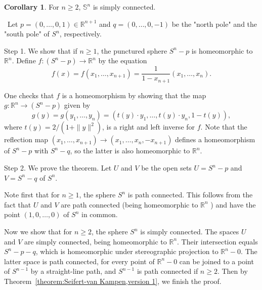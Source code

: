 \documentclass[12pt,a4paper]{book}
\newenvironment{prooff}{{\noindent\it\textcolor{cyan!40!black}{Proof}:}\,}{\par}
\newcommand{\bb}[1]{\mathbb{#1}}
\theoremstyle{definition}
\newtheorem{coro}[defn]{Corollary}
\begin{document}
\begin{coro}
    For $n\ge 2$, $\bb{S}^n$ is simply connected.
    \label{corollary:Sn is simply connect}
\end{coro}
\begin{prooff}
    Let $p=(0, \ldots, 0,1) \in \mathbb{R}^{n+1}$ and $q=(0, \ldots, 0,-1)$ be the "north pole" and the "south pole" of $S^n$, respectively.

    Step 1. We show that if $n \geq 1$, the punctured sphere $S^n-p$ is homeomorphic to $\mathbb{R}^n$.
    Define $f:\left(S^n-p\right) \rightarrow \mathbb{R}^n$ by the equation
    $$
        f(x)=f\left(x_1, \ldots, x_{n+1}\right)=\frac{1}{1-x_{n+1}}\left(x_1, \ldots, x_n\right) .
    $$

    One checks that $f$ is a homeomorphism by showing that the map $g: \mathbb{R}^n \rightarrow\left(S^n-p\right)$ given by
    $$
        g(y)=g\left(y_1, \ldots, y_n\right)=\left(t(y) \cdot y_1, \ldots, t(y) \cdot y_n, 1-t(y)\right),
    $$
    where $t(y)=2 /\left(1+\|y\|^2\right)$, is a right and left inverse for $f$.
    Note that the reflection map $\left(x_1, \ldots, x_{n+1}\right) \rightarrow\left(x_1, \ldots, x_n,-x_{n+1}\right)$ defines a homeomorphism of $S^n-p$ with $S^n-q$, so the latter is also homeomorphic to $\mathbb{R}^n$.

    Step 2. We prove the theorem. Let $U$ and $V$ be the open sets $U=S^n-p$ and $V=S^n-q$ of $S^n$.

    Note first that for $n \geq 1$, the sphere $S^n$ is path connected. This follows from the fact that $U$ and $V$ are path connected (being homeomorphic to $\mathbb{R}^n$ ) and have the point $(1,0, \ldots, 0)$ of $S^n$ in common.

    Now we show that for $n \geq 2$, the sphere $S^n$ is simply connected. The spaces $U$ and $V$ are simply connected, being homeomorphic to $\mathbb{R}^n$. 
    Their intersection equals $S^n-p-q$, which is homeomorphic under stereographic projection to $\mathbb{R}^n-0$. 
    The latter space is path connected, for every point of $\mathbb{R}^n-0$ can be joined to a point of $S^{n-1}$ by a straight-line path, and $S^{n-1}$ is path connected if $n \geq 2$.
    Then by Theorem~\ref{theorem:Seifert-van Kampen,version 1}, we finish the proof.
\end{prooff}
\end{document}

